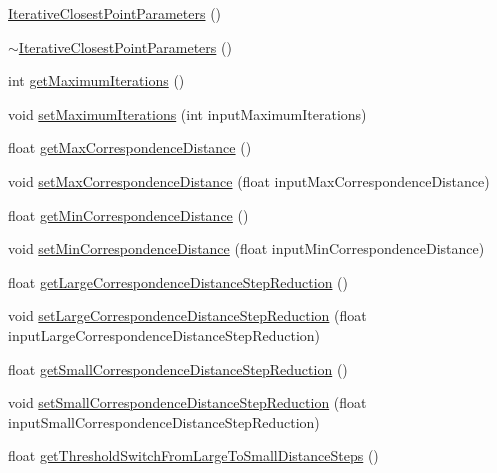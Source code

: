 \begin{DoxyCompactItemize}
\item 
\hyperlink{classIterativeClosestPointParameters_ac22cf5ddf2c6bdf35e4a25d520607c93}{Iterative\-Closest\-Point\-Parameters} ()
\item 
\hyperlink{classIterativeClosestPointParameters_a6bf05e4be2c1dacecaf5fcbf0e39c859}{$\sim$\-Iterative\-Closest\-Point\-Parameters} ()
\item 
int \hyperlink{classIterativeClosestPointParameters_a6f9644c27cf260b51875e648df2f5383}{get\-Maximum\-Iterations} ()
\item 
void \hyperlink{classIterativeClosestPointParameters_ab793da4dfd1166ed410a4ce75564fa42}{set\-Maximum\-Iterations} (int input\-Maximum\-Iterations)
\item 
float \hyperlink{classIterativeClosestPointParameters_a85b817764264f245084458c5b1d29495}{get\-Max\-Correspondence\-Distance} ()
\item 
void \hyperlink{classIterativeClosestPointParameters_ace991aa94a654839617451db83e7957c}{set\-Max\-Correspondence\-Distance} (float input\-Max\-Correspondence\-Distance)
\item 
float \hyperlink{classIterativeClosestPointParameters_a54bfe06276b42c30c4696260691baf88}{get\-Min\-Correspondence\-Distance} ()
\item 
void \hyperlink{classIterativeClosestPointParameters_a8b61a05336a7f00d91d7eb6a2774615a}{set\-Min\-Correspondence\-Distance} (float input\-Min\-Correspondence\-Distance)
\item 
float \hyperlink{classIterativeClosestPointParameters_ab7073c148fc7f27b6eefa9ad09c458fa}{get\-Large\-Correspondence\-Distance\-Step\-Reduction} ()
\item 
void \hyperlink{classIterativeClosestPointParameters_a58c4a6d6a2dfc4c5af3f25ae2c7b1887}{set\-Large\-Correspondence\-Distance\-Step\-Reduction} (float input\-Large\-Correspondence\-Distance\-Step\-Reduction)
\item 
float \hyperlink{classIterativeClosestPointParameters_a0d05c1de0da47367703f8f8ba7272fce}{get\-Small\-Correspondence\-Distance\-Step\-Reduction} ()
\item 
void \hyperlink{classIterativeClosestPointParameters_a2318311bbba1ebf252572ada4983ad58}{set\-Small\-Correspondence\-Distance\-Step\-Reduction} (float input\-Small\-Correspondence\-Distance\-Step\-Reduction)
\item 
float \hyperlink{classIterativeClosestPointParameters_a816c8ed3a323e3b1a38dd6ba09c38f85}{get\-Threshold\-Switch\-From\-Large\-To\-Small\-Distance\-Steps} ()

\end{DoxyCompactItemize}
